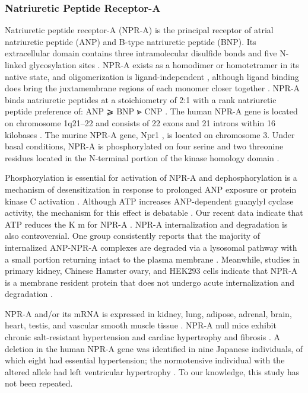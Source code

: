 \documentclass[14pt,a4paper,onecolumn]{article}
\begin{document}
\subsubsection{Natriuretic Peptide Receptor-A}
Natriuretic peptide receptor-A (NPR-A) is the principal receptor of atrial natriuretic peptide (ANP) and B-type natriuretic peptide (BNP). Its extracellular domain contains three intramolecular disulfide bonds and five N-linked glycosylation sites \citep{Miyagi2000} \citep{Miyagi2000}. NPR-A exists as a homodimer or homotetramer in its native state, and oligomerization is ligand-independent \citep{Chinkers1992} \citep{Iwata1991}, although ligand binding does bring the juxtamembrane regions of each monomer closer together \citep{Labrecque2001}.
NPR-A binds natriuretic peptides at a stoichiometry of 2:1 with a rank natriuretic peptide preference of: ANP ⩾ BNP ⪢ CNP \citep{Bennett1991} \citep{Koller1991} \citep{Suga1992a}. The human NPR-A gene is located on chromosome 1q21–22 and consists of 22 exons and 21 introns within 16 kilobases \citep{Lowe 1990} \citep{Takahashi1998}. The murine NPR-A gene, Npr1 , is located on chromosome 3. Under basal conditions, NPR-A is phosphorylated on four serine and two threonine residues located in the N-terminal portion of the kinase homology domain \citep{Potter1998b}.

Phosphorylation is essential for activation of NPR-A and dephosphorylation is a mechanism of desensitization in response to prolonged ANP exposure or protein kinase C activation \citep{Potter1992} \citep{Potter1994}. Although ATP increases ANP-dependent guanylyl cyclase activity, the mechanism for this effect is debatable \citep{Antos2005} \citep{Antos2007} \citep{Burczynska2007} \citep{Joubert2005}.
Our recent data indicate that ATP reduces the K m for NPR-A \citep{Antos2007}. NPR-A internalization and degradation is also controversial. One group consistently reports that the majority of internalized ANP-NPR-A complexes are degraded via a lysosomal pathway with a small portion returning intact to the plasma membrane \citep{Pandey2002}. Meanwhile, studies in primary kidney, Chinese Hamster ovary, and HEK293 cells indicate that NPR-A is a membrane resident protein that does not undergo acute internalization and degradation \citep{Fan2005} \citep{Koh1992} \citep{Vieira2001}.

NPR-A and/or its mRNA is expressed in kidney, lung, adipose, adrenal, brain, heart, testis, and vascular smooth muscle tissue \citep{Goy2001} \citep{Lowe1989} \citep{Nagase1997} \citep{Wilcox1991}. NPR-A null mice exhibit chronic salt-resistant hypertension and cardiac hypertrophy and fibrosis \citep{Kuhn2002} \citep{Lopez1995} \citep{Oliver1997}.
A deletion in the human NPR-A gene was identified in nine Japanese individuals, of which eight had essential hypertension; the normotensive individual with the altered allele had left ventricular hypertrophy \citep{Nakayama2000}. To our knowledge, this study has not been repeated.
\end{document}
